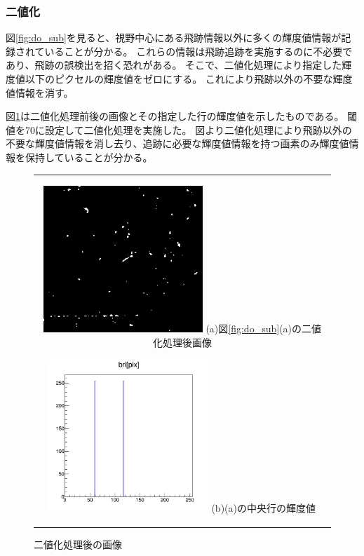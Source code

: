 \documentclass[12pt,a4paper]{jarticle}
\begin{document}
\subsubsection{二値化}
図\ref{fig:do_sub}を見ると、視野中心にある飛跡情報以外に多くの輝度値情報が記録されていることが分かる。
これらの情報は飛跡追跡を実施するのに不必要であり、飛跡の誤検出を招く恐れがある。
そこで、二値化処理により指定した輝度値以下のピクセルの輝度値をゼロにする。
これにより飛跡以外の不要な輝度値情報を消す。
\par
図\ref{fig:do_thre}は二値化処理前後の画像とその指定した行の輝度値を示したものである。
閾値を70に設定して二値化処理を実施した。
図より二値化処理により飛跡以外の不要な輝度値情報を消し去り、追跡に必要な輝度値情報を持つ画素のみ輝度値情報を保持していることが分かる。
\begin{figure}[htbp]
  \centering
      \begin{tabular}{c}
        \begin{minipage}{0.5\hsize}
          \centering
            \includegraphics[clip, width=60mm]{thre.png}
            \hspace{1.6cm} (a)図\ref{fig:do_sub}(a)の二値化処理後画像
        \end{minipage}

        \begin{minipage}{0.5\hsize}
          \centering
            \includegraphics[clip, width=60mm]{thre_hist.png}
            \hspace{1.6cm} (b)(a)の中央行の輝度値
        \end{minipage}
    
      \end{tabular}
      \caption{二値化処理後の画像\label{fig:do_thre}}
\end{figure}
\newpage
\end{document}
